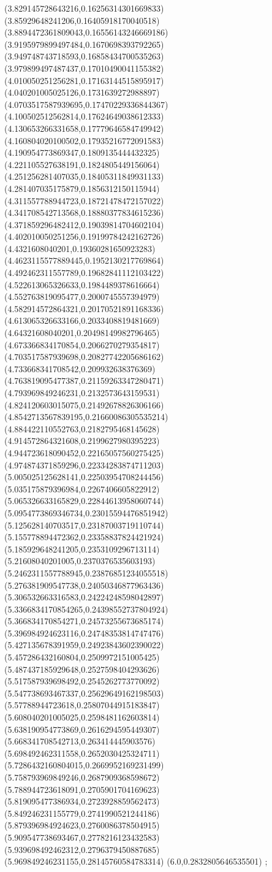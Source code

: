 {(3.829145728643216,0.16256314301669833)
(3.85929648241206,0.16405918170040518)
(3.8894472361809043,0.16556143246669186)
(3.9195979899497484,0.1670698393792265)
(3.949748743718593,0.16858434700535263)
(3.979899497487437,0.17010490041155382)
(4.010050251256281,0.17163144515895917)
(4.040201005025126,0.1731639272988897)
(4.0703517587939695,0.17470229336844367)
(4.100502512562814,0.17624649038612333)
(4.130653266331658,0.17779646584749942)
(4.160804020100502,0.17935216772091583)
(4.190954773869347,0.1809135444432325)
(4.221105527638191,0.1824805449156064)
(4.251256281407035,0.18405311849931133)
(4.281407035175879,0.1856312150115944)
(4.311557788944723,0.18721478472157022)
(4.341708542713568,0.18880377834615236)
(4.371859296482412,0.19039814704602104)
(4.402010050251256,0.19199784242162726)
(4.4321608040201,0.19360281650923283)
(4.4623115577889445,0.1952130217769864)
(4.492462311557789,0.19682841112103422)
(4.522613065326633,0.1984489378616664)
(4.552763819095477,0.2000745557394979)
(4.582914572864321,0.20170521891168336)
(4.613065326633166,0.2033408819481669)
(4.64321608040201,0.20498149982796465)
(4.673366834170854,0.2066270279354817)
(4.703517587939698,0.20827742205686162)
(4.733668341708542,0.209932638376369)
(4.763819095477387,0.21159263347280471)
(4.793969849246231,0.2132573643159531)
(4.824120603015075,0.21492678826306166)
(4.8542713567839195,0.21660086305535214)
(4.884422110552763,0.2182795468145628)
(4.914572864321608,0.2199627980395223)
(4.944723618090452,0.22165057560275425)
(4.974874371859296,0.22334283874711203)
(5.005025125628141,0.22503954708244456)
(5.035175879396984,0.2267406605822912)
(5.065326633165829,0.22844613958060744)
(5.0954773869346734,0.23015594476851942)
(5.125628140703517,0.23187003719110744)
(5.155778894472362,0.23358837824421924)
(5.185929648241205,0.2353109296713114)
(5.21608040201005,0.2370376535603193)
(5.2462311557788945,0.23876851234055518)
(5.276381909547738,0.24050346877963436)
(5.306532663316583,0.24224248598042897)
(5.3366834170854265,0.24398552737804924)
(5.366834170854271,0.24573255673685174)
(5.396984924623116,0.24748353814747476)
(5.427135678391959,0.24923843602390022)
(5.457286432160804,0.2509972151005425)
(5.487437185929648,0.2527598404293626)
(5.517587939698492,0.2545262773770092)
(5.547738693467337,0.25629649162198503)
(5.57788944723618,0.25807044915183847)
(5.608040201005025,0.2598481162603814)
(5.638190954773869,0.2616294595449307)
(5.668341708542713,0.263414445903576)
(5.698492462311558,0.2652030425324711)
(5.7286432160804015,0.2669952169231499)
(5.758793969849246,0.2687909368598672)
(5.788944723618091,0.2705901704169623)
(5.819095477386934,0.2723928859562473)
(5.849246231155779,0.2741990521244186)
(5.879396984924623,0.2760086378504915)
(5.909547738693467,0.2778216123432583)
(5.939698492462312,0.2796379450887685)
(5.969849246231155,0.28145760584783314)
(6.0,0.2832805646535501)
};
